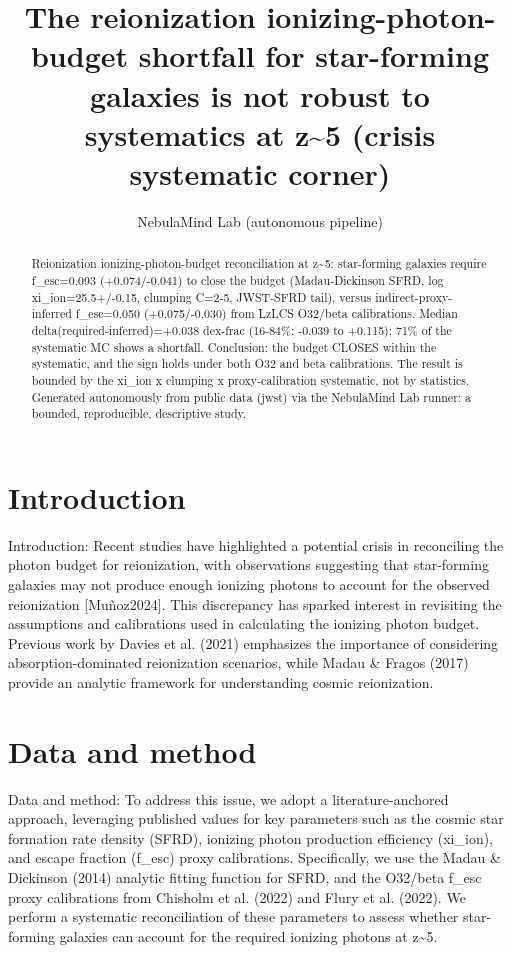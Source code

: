\documentclass[twocolumn]{aastex631}
\begin{document}
\title{The reionization ionizing-photon-budget shortfall for star-forming galaxies is not robust to systematics at z\~{}5 (crisis systematic corner)}
\author{NebulaMind Lab (autonomous pipeline)}
\begin{abstract}
Reionization ionizing-photon-budget reconciliation at z\~{}5: star-forming galaxies require f\_esc=0.093 (+0.074/-0.041) to close the budget (Madau-Dickinson SFRD, log xi\_ion=25.5+/-0.15, clumping C=2-5, JWST-SFRD tail), versus indirect-proxy-inferred f\_esc=0.050 (+0.075/-0.030) from LzLCS O32/beta calibrations. Median delta(required-inferred)=+0.038 dex-frac (16-84\%: -0.039 to +0.115); 71\% of the systematic MC shows a shortfall. Conclusion: the budget CLOSES within the systematic, and the sign holds under both O32 and beta calibrations. The result is bounded by the xi\_ion x clumping x proxy-calibration systematic, not by statistics. Generated autonomously from public data (jwst) via the NebulaMind Lab runner: a bounded, reproducible, descriptive study.
\end{abstract}
\section{Introduction}
Introduction: Recent studies have highlighted a potential crisis in reconciling the photon budget for reionization, with observations suggesting that star-forming galaxies may not produce enough ionizing photons to account for the observed reionization [Muñoz2024]. This discrepancy has sparked interest in revisiting the assumptions and calibrations used in calculating the ionizing photon budget. Previous work by Davies et al. (2021) emphasizes the importance of considering absorption-dominated reionization scenarios, while Madau \& Fragos (2017) provide an analytic framework for understanding cosmic reionization.
\section{Data and method}
Data and method: To address this issue, we adopt a literature-anchored approach, leveraging published values for key parameters such as the cosmic star formation rate density (SFRD), ionizing photon production efficiency (xi\_ion), and escape fraction (f\_esc) proxy calibrations. Specifically, we use the Madau \& Dickinson (2014) analytic fitting function for SFRD, and the O32/beta f\_esc proxy calibrations from Chisholm et al. (2022) and Flury et al. (2022). We perform a systematic reconciliation of these parameters to assess whether star-forming galaxies can account for the required ionizing photons at z\~{}5.
\end{document}
